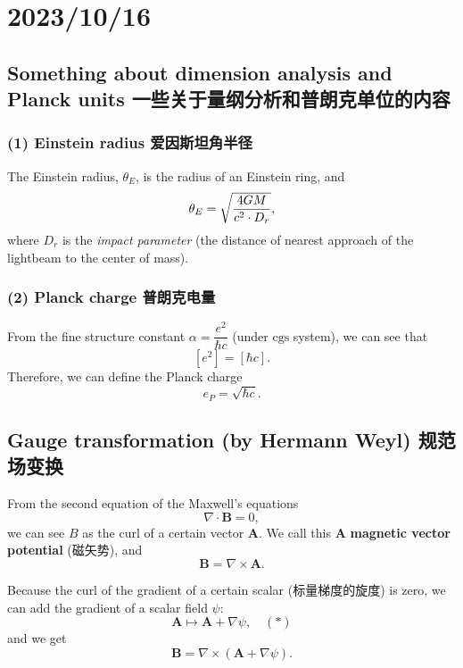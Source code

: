 \chapter{2023/10/16}\label{20231016}

\section{Something about dimension analysis and Planck units
一些关于量纲分析和普朗克单位的内容}\label{something-about-dimension-analysis-and-planck-units-ux4e00ux4e9bux5173ux4e8eux91cfux7eb2ux5206ux6790ux548cux666eux6717ux514bux5355ux4f4dux7684ux5185ux5bb9}

\subsection*{(1) Einstein radius
爱因斯坦角半径}\label{einstein-radius-ux7231ux56e0ux65afux5766ux89d2ux534aux5f84}

The Einstein radius, \(\theta_E\), is the radius of an Einstein ring,
and \[\theta_E = \sqrt{4GM \over c^2 \cdot D_r},\] where \(D_r\) is the
\emph{impact parameter} (the distance of nearest approach of the
lightbeam to the center of mass).

\subsection*{(2) Planck charge
普朗克电量}\label{planck-charge-ux666eux6717ux514bux7535ux91cf}

From the fine structure constant \(\alpha = \dfrac{e^2}{\hbar c}\)
(under \(\text{cgs}\) system), we can see that \[[e^2] = [\hbar c].\]
Therefore, we can define the Planck charge \[e_P = \sqrt{\hbar c}.\]

\section{Gauge transformation (by Hermann Weyl)
规范场变换}\label{gauge-transformation-by-hermann-weyl-ux89c4ux8303ux573aux53d8ux6362}

From the second equation of the Maxwell's equations \[\nabla \cdot \boldsymbol B = 0,\] we can see \(B\) as the curl of a certain vector \(\boldsymbol A\). We call this \(\boldsymbol A\)
\textbf{magnetic vector potential} (磁矢势), and
\[\boldsymbol B  = \nabla \times \boldsymbol A.\]

Because the curl of the gradient of a certain scalar (标量梯度的旋度) is zero, we can add the gradient of a scalar field \(\psi\): \[\boldsymbol A \mapsto \boldsymbol A + \nabla \psi, \quad  (*)\] and we get \[\boldsymbol B  = \nabla \times (\boldsymbol A + \nabla \psi).\]

